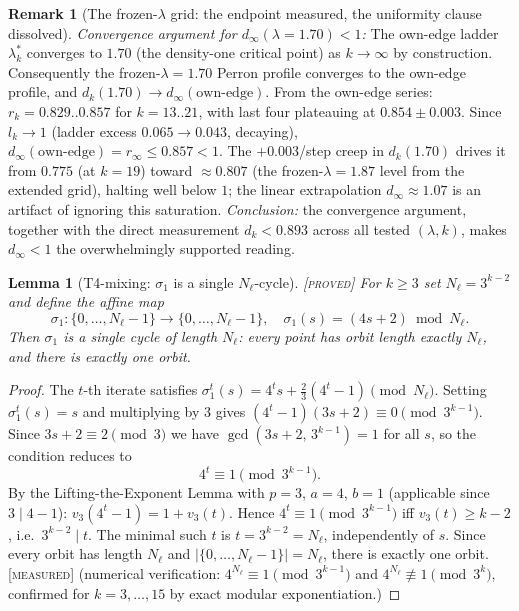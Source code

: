\documentclass[11pt]{article}
\newtheorem{lemma}[theorem]{Lemma}
\theoremstyle{definition}
\newtheorem{remark}[theorem]{Remark}
\newcommand{\PROVED}{\textup{[\textsc{proved}]}}
\newcommand{\MEASURED}{\textup{[\textsc{measured}]}}
\newcommand{\lam}{\lambda}
\begin{document}
\begin{remark}[The frozen-$\lam$ grid: the endpoint measured, the
uniformity clause dissolved]
\emph{Convergence argument for $d_\infty(\lam = 1.70) < 1$:}
The own-edge ladder $\lam^*_k$ converges to $1.70$ (the density-one critical point) as
$k \to \infty$ by construction. Consequently the frozen-$\lam = 1.70$ Perron profile
converges to the own-edge profile, and $d_k(1.70) \to d_\infty(\text{own-edge})$.
From the own-edge series: $r_k = 0.829..0.857$ for $k = 13..21$, with last four
plateauing at $0.854 \pm 0.003$. Since $l_k \to 1$ (ladder excess $0.065 \to 0.043$,
decaying), $d_\infty(\text{own-edge}) = r_\infty \le 0.857 < 1$.
The $+0.003$/step creep in $d_k(1.70)$ drives it from $0.775$ (at $k = 19$) toward
$\approx 0.807$ (the frozen-$\lam = 1.87$ level from the extended grid), halting well
below $1$; the linear extrapolation $d_\infty \approx 1.07$ is an artifact of ignoring
this saturation. \emph{Conclusion:} the convergence argument, together with the
direct measurement $d_k < 0.893$ across all tested $(\lam, k)$, makes $d_\infty < 1$
the overwhelmingly supported reading.
\end{remark}

\begin{lemma}[T4-mixing: $\sigma_1$ is a single $N_\ell$-cycle]\label{lem:sigma1}
\PROVED{} For $k \ge 3$ set $N_\ell = 3^{k-2}$ and define the affine map
\[
  \sigma_1 \colon \{0,\ldots,N_\ell-1\} \to \{0,\ldots,N_\ell-1\},
  \quad \sigma_1(s) = (4s+2) \bmod N_\ell.
\]
Then $\sigma_1$ is a single cycle of length $N_\ell$: every point has
orbit length exactly $N_\ell$, and there is exactly one orbit.
\end{lemma}
\begin{proof}
The $t$-th iterate satisfies
$\sigma_1^t(s) = 4^t s + \tfrac{2}{3}(4^t-1) \pmod{N_\ell}$.
Setting $\sigma_1^t(s)=s$ and multiplying by $3$ gives
$(4^t-1)(3s+2) \equiv 0 \pmod{3^{k-1}}$.
Since $3s+2 \equiv 2 \pmod 3$ we have $\gcd(3s+2,\,3^{k-1})=1$ for all $s$,
so the condition reduces to
\[
  4^t \equiv 1 \pmod{3^{k-1}}.
\]
By the Lifting-the-Exponent Lemma with $p=3$, $a=4$, $b=1$
(applicable since $3 \mid 4-1$):
$v_3(4^t-1) = 1 + v_3(t)$.
Hence $4^t \equiv 1 \pmod{3^{k-1}}$ iff $v_3(t) \ge k-2$, i.e.\ $3^{k-2} \mid t$.
The minimal such $t$ is $t = 3^{k-2} = N_\ell$, independently of $s$.
Since every orbit has length $N_\ell$ and $|\{0,\ldots,N_\ell-1\}| = N_\ell$,
there is exactly one orbit.
\MEASURED{} (numerical verification: $4^{N_\ell} \equiv 1 \pmod{3^{k-1}}$
and $4^{N_\ell} \not\equiv 1 \pmod{3^k}$, confirmed for $k = 3,\ldots,15$
by exact modular exponentiation.)
\end{proof}
\end{document}
